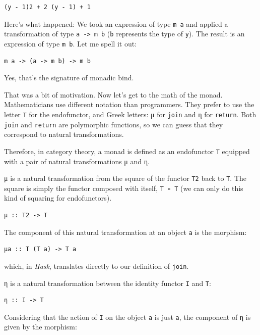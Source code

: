 \begin{verbatim}
(y - 1)2 + 2 (y - 1) + 1
\end{verbatim}

Here's what happened: We took an expression of type \texttt{m\ a} and
applied a transformation of type \texttt{a\ -\textgreater{}\ m\ b}
(\texttt{b} represents the type of \texttt{y}). The result is an
expression of type \texttt{m\ b}. Let me spell it out:

\begin{verbatim}
m a -> (a -> m b) -> m b
\end{verbatim}

Yes, that's the signature of monadic bind.

That was a bit of motivation. Now let's get to the math of the monad.
Mathematicians use different notation than programmers. They prefer to
use the letter \texttt{T} for the endofunctor, and Greek letters: μ for
\texttt{join} and η for \texttt{return}. Both \texttt{join} and
\texttt{return} are polymorphic functions, so we can guess that they
correspond to natural transformations.

Therefore, in category theory, a monad is defined as an endofunctor
\texttt{T} equipped with a pair of natural transformations μ and η.

μ is a natural transformation from the square of the functor \texttt{T2}
back to \texttt{T}. The square is simply the functor composed with
itself, \texttt{T\ ∘\ T} (we can only do this kind of squaring for
endofunctors).

\begin{verbatim}
μ :: T2 -> T
\end{verbatim}

The component of this natural transformation at an object \texttt{a} is
the morphism:

\begin{verbatim}
μa :: T (T a) -> T a
\end{verbatim}

which, in \emph{Hask}, translates directly to our definition of
\texttt{join}.

η is a natural transformation between the identity functor \texttt{I}
and \texttt{T}:

\begin{verbatim}
η :: I -> T
\end{verbatim}

Considering that the action of \texttt{I} on the object \texttt{a} is
just \texttt{a}, the component of η is given by the morphism:

